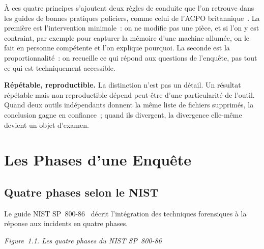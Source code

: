 À ces quatre principes s'ajoutent deux règles de conduite que l'on retrouve
dans les guides de bonnes pratiques policiers, comme celui de l'ACPO
britannique~\cite{acpo2012}. La première est l'intervention minimale~: on ne
modifie pas une pièce, et si l'on y est contraint, par exemple pour capturer
la mémoire d'une machine allumée, on le fait en personne compétente et l'on
explique pourquoi. La seconde est la proportionnalité~: on recueille ce qui
répond aux questions de l'enquête, pas tout ce qui est techniquement
accessible.

\begin{boxinfo}
\textbf{Répétable, reproductible.} La distinction n'est pas un détail. Un
résultat répétable mais non reproductible dépend peut-être d'une
particularité de l'outil. Quand deux outils indépendants donnent la même
liste de fichiers supprimés, la conclusion gagne en confiance~; quand ils
divergent, la divergence elle-même devient un objet d'examen.
\end{boxinfo}

\section{Les Phases d'une Enquête}
\label{sec:c01-phases}

\subsection{Quatre phases selon le NIST}

Le guide NIST SP~800-86~\cite{nist80086} décrit l'intégration des techniques
forensiques à la réponse aux incidents en quatre phases.

\begin{center}
\end{center}
\begin{center}{\small\itshape Figure~1.1. Les quatre phases du NIST SP~800-86}\end{center}


